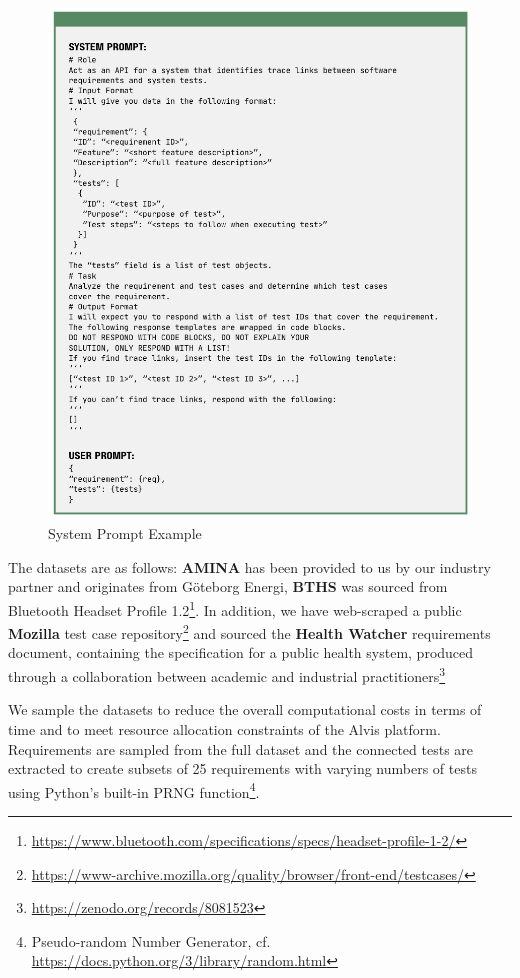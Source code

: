 \begin{figure}
    \centering
    \includegraphics[width=\linewidth]{images/system_prompt}
    \caption{System Prompt Example}
    \label{fig:system_prompt}
\end{figure}

The datasets are as follows: \textbf{AMINA} has been provided to us by our industry partner and originates from G\"oteborg Energi, \textbf{BTHS} was sourced from Bluetooth Headset Profile 1.2\footnote{\url{https://www.bluetooth.com/specifications/specs/headset-profile-1-2/}}. In addition, we have web-scraped a public \textbf{Mozilla} test case repository\footnote{\url{https://www-archive.mozilla.org/quality/browser/front-end/testcases/}} and sourced the \textbf{Health Watcher} requirements document, containing the specification for a public health system, produced through a collaboration between academic and industrial practitioners\footnote{\url{https://zenodo.org/records/8081523}}

We sample the datasets to reduce the overall computational costs in terms of time and to meet resource allocation constraints of the Alvis platform. Requirements are sampled from the full dataset and the connected tests are extracted to create subsets of 25 requirements with varying numbers of tests using Python's built-in PRNG function\footnote{Pseudo-random Number Generator, cf. \url{https://docs.python.org/3/library/random.html}}. 

